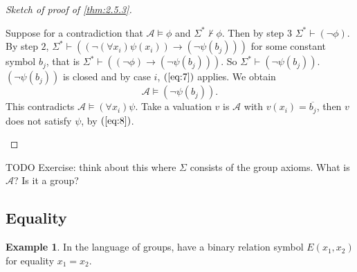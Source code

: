 \documentclass{article}
\newcommand{\A}{\mathcal{A}}
\newcommand{\rb}[1]{\left( #1 \right)}
\newcommand{\notb}[1]{\rb{\neg #1}}
\newcommand{\impb}[2]{\rb{#1 \rightarrow #2}}
\newcommand{\fab}[1]{\rb{\forall #1}}
\theoremstyle{definition}\newtheorem{definition}{Definition}[subsection]
\theoremstyle{definition}\newtheorem{remark}[definition]{Remark}
\theoremstyle{definition}\newtheorem*{example}{Example}
\theoremstyle{definition}\newtheorem*{note}{Note}
\begin{document}
\begin{proof}[Sketch of proof of \ref{thm:2.5.3}]
\begin{enumerate}
\begin{enumerate}
\end{enumerate}
Suppose for a contradiction that $ \A \vDash \phi $ and $ \Sigma^* \not\vdash \phi $. Then by step $ 3 $ $ \Sigma^* \vdash \notb{\phi} $. By step $ 2 $, $ \Sigma^* \vdash \impb{\notb{\fab{x_i}\psi\rb{x_i}}}{\notb{\psi\rb{b_j}}} $ for some constant symbol $ b_j $, that is $ \Sigma^* \vdash \impb{\notb{\phi}}{\notb{\psi\rb{b_j}}} $. So $ \Sigma^* \vdash \notb{\psi\rb{b_j}} $. $ \notb{\psi\rb{b_j}} $ is closed and by case $ i $, $ \rb{\ref{eq:7}} $ applies. We obtain
\begin{equation}
\label{eq:8}
\A \vDash \notb{\psi\rb{b_j}}.
\end{equation}
This contradicts $ \A \vDash \fab{x_i}\psi $. Take a valuation $ v $ is $ \A $ with $ v\rb{x_i} = \overline{b_j} $, then $ v $ does not satisfy $ \psi $, by $ \rb{\ref{eq:8}} $.
\end{enumerate}
\end{proof}

TODO Exercise: think about this where $ \Sigma $ consists of the group axioms. What is $ \A $? Is it a group?


\subsection{Equality}

\begin{example}
In the language of groups, have a binary relation symbol $ E\rb{x_1, x_2} $ for equality $ x_1 = x_2 $.
\end{example}
\end{document}
